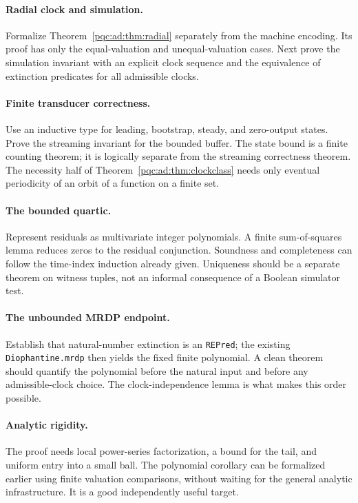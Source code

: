 \documentclass[11pt,letterpaper]{article}
\numberwithin{equation}{section}
\theoremstyle{definition}
\theoremstyle{remark}
\begin{document}
\paragraph{Radial clock and simulation.}
Formalize Theorem~\ref{pqc:ad:thm:radial} separately from the machine encoding.
Its proof has only the equal-valuation and unequal-valuation cases.
Next prove the simulation invariant with an explicit clock sequence and
the equivalence of extinction predicates for all admissible clocks.

\paragraph{Finite transducer correctness.}
Use an inductive type for leading, bootstrap, steady, and zero-output
states. Prove the streaming invariant for the bounded buffer. The state
bound is a finite counting theorem; it is logically separate from the
streaming correctness theorem. The necessity half of
Theorem~\ref{pqc:ad:thm:clockclass} needs only eventual periodicity of an orbit of
a function on a finite set.

\paragraph{The bounded quartic.}
Represent residuals as multivariate integer polynomials. A finite
sum-of-squares lemma reduces zeros to the residual conjunction. Soundness
and completeness can follow the time-index induction already given.
Uniqueness should be a separate theorem on witness tuples, not an
informal consequence of a Boolean simulator test.

\paragraph{The unbounded MRDP endpoint.}
Establish that natural-number extinction is an \texttt{REPred}; the existing
\texttt{Diophantine.mrdp} then yields the fixed finite polynomial.
A clean theorem should quantify the polynomial before the natural input
and before any admissible-clock choice. The clock-independence lemma is
what makes this order possible.

\paragraph{Analytic rigidity.}
The proof needs local power-series factorization, a bound for the tail,
and uniform entry into a small ball. The polynomial corollary can be
formalized earlier using finite valuation comparisons, without waiting
for the general analytic infrastructure. It is a good independently
useful target.
\end{document}
